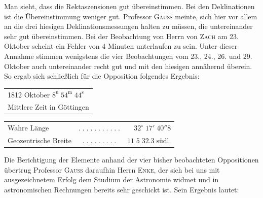 \par\indent Man sieht, dass die Rektaszensionen gut übereinstimmen. Bei den Deklinationen ist die Übereinstimmung weniger gut. Professor \textsc{Gauss} meinte, sich hier vor allem an die drei hiesigen Deklinationsmessungen halten zu müssen, die untereinander sehr gut übereinstimmen. Bei der Beobachtung von Herrn von \textsc{Zach} am 23. Oktober scheint ein Fehler von 4 Minuten unterlaufen zu sein. Unter dieser Annahme stimmen wenigstens die vier Beobachtungen vom 23., 24., 26. und 29. Oktober auch untereinander recht gut und mit den hiesigen annähernd überein. So ergab sich schließlich für die Opposition folgendes Ergebnis:

\medskip
\begin{center}\fontsize{10}{12}\selectfont\setlength{\tabcolsep}{2pt}\renewcommand{\arraystretch}{1.15}\begin{tabular}{l}
1812 Oktober $8^{\mathrm u}\;54^{\mathrm m}\;44^{\mathrm s}$\\Mittlere Zeit in Göttingen
\end{tabular}\end{center}
\begin{center}\fontsize{10}{12}\selectfont\setlength{\tabcolsep}{2pt}\renewcommand{\arraystretch}{1.15}\begin{tabular}{lcr}
Wahre Länge & $.\;.\;.\;.\;.\;.\;.\;.\;.\;.\;.$ & $32^\circ\;17'\;40''8$\\
Geozentrische Breite & $.\;.\;.\;.\;.\;.\;.\;.\;.$ & $11\;5\;32.3\;\text{südl.}$\\
\end{tabular}\end{center}

\par\indent Die Berichtigung der Elemente anhand der vier bisher beobachteten Oppositionen übertrug Professor \textsc{Gauss} daraufhin Herrn \textsc{Enke}, der sich bei uns mit ausgezeichnetem Erfolg dem Studium der Astronomie widmet und in astronomischen Rechnungen bereits sehr geschickt ist. Sein Ergebnis lautet:

